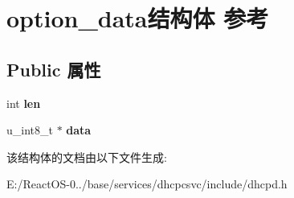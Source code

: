\hypertarget{structoption__data}{}\section{option\+\_\+data结构体 参考}
\label{structoption__data}
\subsection*{Public 属性}
\begin{DoxyCompactItemize}
\item 
\mbox{\label{structoption__data_aa4d52556e24a2a0cdc060ccce57a144f}} 
int {\bfseries len}
\item 
\mbox{\label{structoption__data_aefdaa345bcb8128d8d64fbf993e6c205}} 
u\+\_\+int8\+\_\+t $\ast$ {\bfseries data}
\end{DoxyCompactItemize}


该结构体的文档由以下文件生成\+:\begin{DoxyCompactItemize}
\item 
E\+:/\+React\+O\+S-\/0../base/services/dhcpcsvc/include/dhcpd.\+h\end{DoxyCompactItemize}
